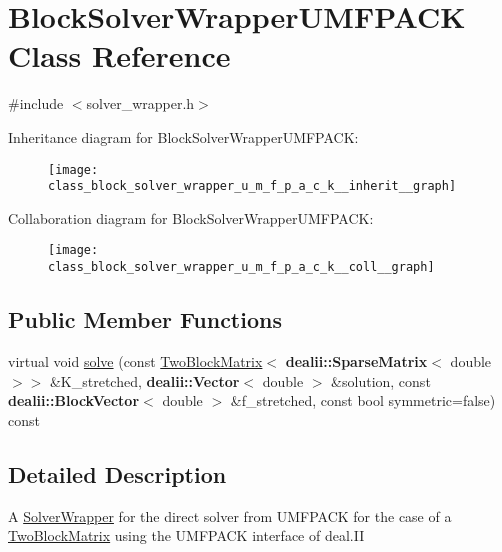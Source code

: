\hypertarget{class_block_solver_wrapper_u_m_f_p_a_c_k}{}\section{Block\+Solver\+Wrapper\+U\+M\+F\+P\+A\+CK Class Reference}
\label{class_block_solver_wrapper_u_m_f_p_a_c_k}


{\ttfamily \#include $<$solver\+\_\+wrapper.\+h$>$}



Inheritance diagram for Block\+Solver\+Wrapper\+U\+M\+F\+P\+A\+CK\+:\nopagebreak
\begin{figure}[H]
\begin{center}
\leavevmode
\texttt{[image: class\_block\_solver\_wrapper\_u\_m\_f\_p\_a\_c\_k\_\_inherit\_\_graph]}
\end{center}
\end{figure}


Collaboration diagram for Block\+Solver\+Wrapper\+U\+M\+F\+P\+A\+CK\+:\nopagebreak
\begin{figure}[H]
\begin{center}
\leavevmode
\texttt{[image: class\_block\_solver\_wrapper\_u\_m\_f\_p\_a\_c\_k\_\_coll\_\_graph]}
\end{center}
\end{figure}
\subsection*{Public Member Functions}
\begin{DoxyCompactItemize}
\item 
virtual void \hyperlink{class_block_solver_wrapper_u_m_f_p_a_c_k_acb9f3b8c9a7996cad23a4d5a663432d7}{solve} (const \hyperlink{class_two_block_matrix}{Two\+Block\+Matrix}$<$ {\bf dealii\+::\+Sparse\+Matrix}$<$ double $>$$>$ \&K\+\_\+stretched, {\bf dealii\+::\+Vector}$<$ double $>$ \&solution, const {\bf dealii\+::\+Block\+Vector}$<$ double $>$ \&f\+\_\+stretched, const bool symmetric=false) const 
\end{DoxyCompactItemize}


\subsection{Detailed Description}
A \hyperlink{class_solver_wrapper}{Solver\+Wrapper} for the direct solver from U\+M\+F\+P\+A\+CK for the case of a \hyperlink{class_two_block_matrix}{Two\+Block\+Matrix} using the U\+M\+F\+P\+A\+CK interface of deal.\+II 

